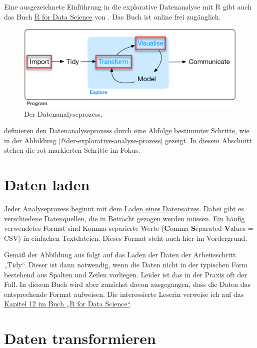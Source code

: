 \documentclass[
]{book}
\begin{document}
Eine ausgezeichnete Einführung in die explorative Datenanalyse mit R gibt auch das Buch \href{https://r4ds.had.co.nz}{R for Data Science} von \citet{wickham_r_2016}. Das Buch ist online frei zugänglich.

\begin{figure}

{\centering \includegraphics[width=0.6\linewidth]{fig/prozess_explorative_datenanalyse} 

}

\caption{Der Datenanalyseprozess.}\label{fig:der-explorative-analyse-prozess}
\end{figure}

\citet{wickham_r_2016} definieren den Datenanalyseprozess durch eine Abfolge bestimmter Schritte, wie in der Abbildung \ref{@der-explorative-analyse-prozess} gezeigt. In diesem Abschnitt stehen die rot markierten Schritte im Fokus.

\hypertarget{daten-laden}{%
\section{Daten laden}\label{daten-laden}}

Jeder Analyseprozess beginnt mit dem \href{}{Laden eines Datensatzes}. Dabei gibt es verschiedene Datenquellen, die in Betracht gezogen werden müssen. Ein häufig verwendetes Format sind Komma-separierte Werte (\textbf{C}omma \textbf{S}eparated \textbf{V}alues = CSV) in einfachen Textdateien. Dieses Format steht auch hier im Vordergrund.

Gemäß der Abbildung aus \citet{wickham_r_2016} folgt auf das Laden der Daten der Arbeitsschritt „Tidy``. Dieser ist dann notwendig, wenn die Daten nicht in der typischen Form bestehend aus Spalten und Zeilen vorliegen. Leider ist das in der Praxis oft der Fall. In diesem Buch wird aber zunächst davon ausgegangen, dass die Daten das entsprechende Format aufweisen. Die interessierte Leserin verweise ich auf das \href{https://r4ds.had.co.nz/tidy-data.html}{Kapitel 12 im Buch „R for Data Science``}.

\hypertarget{daten-transformieren}{%
\section{Daten transformieren}\label{daten-transformieren}}
\end{document}
